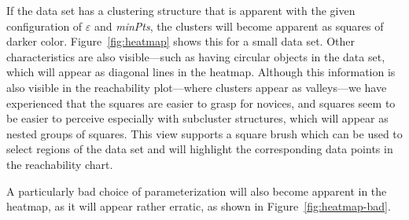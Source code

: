 \documentclass{vgtc}                          %
\begin{document}
If the data set has a clustering structure that is apparent with the given
configuration of $\varepsilon$ and \emph{minPts}, the clusters will become
apparent as squares of darker color. Figure~\ref{fig:heatmap} shows this for a
small data set. Other characteristics are also visible---such as having
circular objects in the data set, which will appear as diagonal lines in the
heatmap. Although this information is also visible in the reachability
plot---where clusters appear as valleys---we have experienced that the squares
are easier to grasp for novices, and squares seem to be easier to perceive
especially with subcluster structures, which will appear as nested groups of
squares. This view supports a square brush which can be used to select regions
of the data set and will highlight the corresponding data points in the
reachability chart.

A particularly bad choice of parameterization will also become apparent in the
heatmap, as it will appear rather erratic, as shown in
Figure~\ref{fig:heatmap-bad}.
\end{document}

